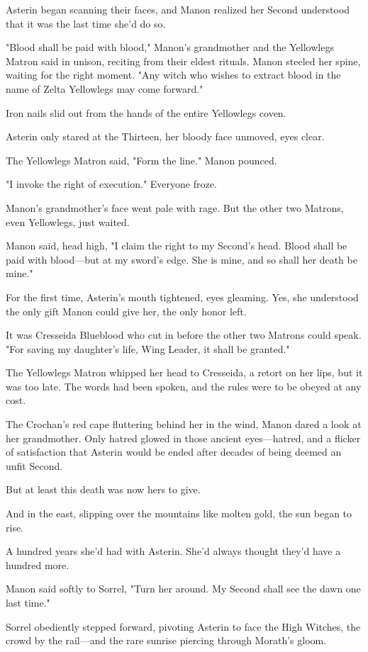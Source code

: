 Asterin began scanning their faces, and Manon realized her Second understood that it was the last time she'd do so.

"Blood shall be paid with blood," Manon's grandmother and the Yellowlegs Matron said in unison, reciting from their eldest rituals.
Manon steeled her spine, waiting for the right moment.
"Any witch who wishes to extract blood in the name of Zelta Yellowlegs may come forward."

Iron nails slid out from the hands of the entire Yellowlegs coven.

Asterin only stared at the Thirteen, her bloody face unmoved, eyes clear.

The Yellowlegs Matron said, "Form the line."
Manon pounced.

"I invoke the right of execution."
Everyone froze.

Manon's grandmother's face went pale with rage.
But the other two Matrons, even Yellowlegs, just waited.

Manon said, head high, "I claim the right to my Second's head.
Blood shall be paid with blood---but at my sword's edge.
She is mine, and so shall her death be mine."

For the first time, Asterin's mouth tightened, eyes gleaming.
Yes, she understood the only gift Manon could give her, the only honor left.

It was Cresseida Blueblood who cut in before the other two Matrons could speak.
"For saving my daughter's life, Wing Leader, it shall be granted."

The Yellowlegs Matron whipped her head to Cresseida, a retort on her lips, but it was too late.
The words had been spoken, and the rules were to be obeyed at any cost.

The Crochan's red cape fluttering behind her in the wind, Manon dared a look at her grandmother.
Only hatred glowed in those ancient eyes---hatred, and a flicker of satisfaction that Asterin would be ended after decades of being deemed an unfit Second.

But at least this death was now hers to give.

And in the east, slipping over the mountains like molten gold, the sun began to rise.

A hundred years she'd had with Asterin.
She'd always thought they'd have a hundred more.

Manon said softly to Sorrel, "Turn her around.
My Second shall see the dawn one last time."

Sorrel obediently stepped forward, pivoting Asterin to face the High Witches, the crowd by the rail---and the rare sunrise piercing through Morath's gloom.

